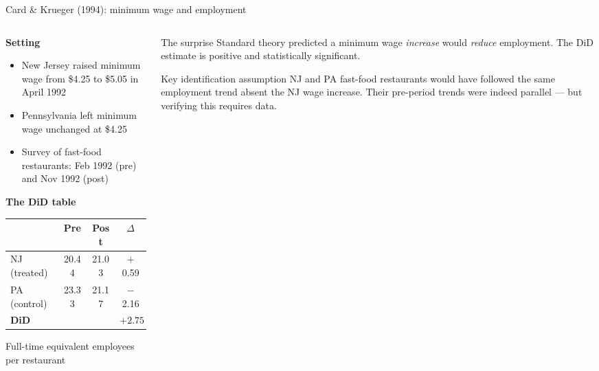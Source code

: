 \documentclass[aspectratio=169, 10pt]{beamer}
\begin{document}
\begin{frame}[shrink=5]{Card \& Krueger (1994): minimum wage and employment}

  \begin{columns}[T]
    \begin{column}{0.52\textwidth}
      \textbf{Setting}
      \begin{itemize}
        \item New Jersey raised minimum wage from \$4.25 to \$5.05 in April 1992
        \item Pennsylvania left minimum wage unchanged at \$4.25
        \item Survey of fast-food restaurants: Feb 1992 (pre) and Nov 1992 (post)
      \end{itemize}
      \bigskip
      \textbf{The DiD table} \small
      \begin{center}
      \begin{tabular}{lcc|c}
        \toprule
         & Pre & Post & $\Delta$ \\
        \midrule
        NJ (treated)   & 20.44 & 21.03 & $+$0.59 \\
        PA (control)   & 23.33 & 21.17 & $-$2.16 \\
        \midrule
        \textbf{DiD}  &       &       & $\mathbf{+2.75}$ \\
        \bottomrule
      \end{tabular}
      \end{center}
      \small Full-time equivalent employees per restaurant
    \end{column}
    \begin{column}{0.44\textwidth}
      \begin{block}{The surprise}
        Standard theory predicted a minimum wage \emph{increase} would \emph{reduce} employment. The DiD estimate is positive and statistically significant.
      \end{block}
      \bigskip
      \begin{alertblock}{Key identification assumption}
        NJ and PA fast-food restaurants would have followed the same employment trend absent the NJ wage increase. Their pre-period trends were indeed parallel — but verifying this requires data.
      \end{alertblock}
      \smallskip
      \small \citet{cardkrueger1994}
    \end{column}
  \end{columns}

\end{frame}
\end{document}
